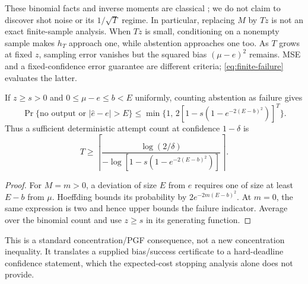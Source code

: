 These binomial facts and inverse moments are classical
\cite{Znid,Drakakis}; we do not claim to discover shot noise or its
$1/\sqrt T$ regime. In particular, replacing $M$ by $Tz$ is not an exact
finite-sample analysis. When $Tz$ is small, conditioning on a nonempty
sample makes $h_T$ approach one, while abstention approaches one too.
As $T$ grows at fixed $z$, sampling error vanishes but the squared bias
$(\mu-e)^2$ remains. MSE and a fixed-confidence error guarantee are
different criteria; \eqref{eq:finite-failure} evaluates the latter.

\begin{corollary}\label{cor:deadline}
If $z\geq s>0$ and $0\leq\mu-e\leq b<E$ uniformly, counting abstention
as failure gives
\begin{equation}\label{eq:deadline-confidence}
 \Pr\{\text{no output or }|\widehat e-e|>E\}
 \leq\min\{1,\,2[1-s(1-e^{-2(E-b)^2})]^T\}.
\end{equation}
Thus a sufficient deterministic attempt count at confidence $1-\delta$ is
\[
 T\geq\left\lceil\frac{\log(2/\delta)}
 {-\log[1-s(1-e^{-2(E-b)^2})]}\right\rceil.
\]
\end{corollary}
\begin{proof}
For $M=m>0$, a deviation of size $E$ from $e$ requires one of size
at least $E-b$ from $\mu$. Hoeffding bounds its probability by
$2e^{-2m(E-b)^2}$. At $m=0$, the same expression is two and hence
upper bounds the failure indicator. Average over the binomial count
and use $z\geq s$ in its generating function.
\end{proof}
This is a standard concentration/PGF consequence, not a new concentration
inequality. It translates a supplied bias/success certificate to a
hard-deadline confidence statement, which the expected-cost stopping
analysis alone does not provide.

